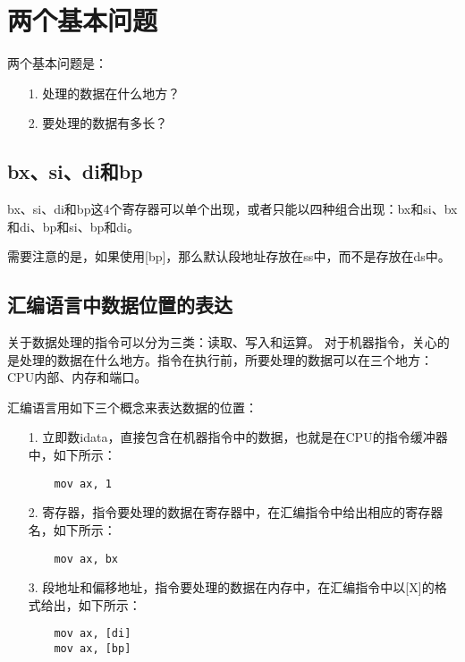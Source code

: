 \documentclass[a4paper,left=2.5cm,right=2.5cm,11pt]{article}
\begin{document}
\tableofcontents

\clearpage

\section{两个基本问题}
	两个基本问题是：
	\begin{itemize}
		\item[1.] 处理的数据在什么地方？
		\item[2.] 要处理的数据有多长？
	\end{itemize}

\subsection{bx、si、di和bp}
	bx、si、di和bp这4个寄存器可以单个出现，或者只能以四种组合出现：bx和si、bx和di、bp和si、bp和di。\par

	需要注意的是，如果使用[bp]，那么默认段地址存放在ss中，而不是存放在ds中。

\subsection{汇编语言中数据位置的表达}
	关于数据处理的指令可以分为三类：读取、写入和运算。
	对于机器指令，关心的是处理的数据在什么地方。指令在执行前，所要处理的数据可以在三个地方：CPU内部、内存和端口。\par

	汇编语言用如下三个概念来表达数据的位置：
	\begin{itemize}
		\item[1.] 立即数idata，直接包含在机器指令中的数据，也就是在CPU的指令缓冲器中，如下所示：
		\begin{lstlisting}
	mov ax, 1
		\end{lstlisting}

		\item[2.] 寄存器，指令要处理的数据在寄存器中，在汇编指令中给出相应的寄存器名，如下所示：
		\begin{lstlisting}
	mov ax, bx
		\end{lstlisting}

		\item[3.] 段地址和偏移地址，指令要处理的数据在内存中，在汇编指令中以[X]的格式给出，如下所示：
		\begin{lstlisting}
	mov ax, [di]
	mov ax, [bp]
		\end{lstlisting}
	\end{itemize}
\end{document}
